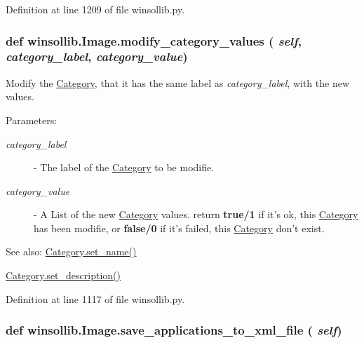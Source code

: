 Definition at line 1209 of file winsollib.py.\hypertarget{classwinsollib_1_1Image_8fc4339cad75e0b687bba38e2fbd2545}{
\subsubsection[modify\_\-category\_\-values]{\setlength{\rightskip}{0pt plus 5cm}def winsollib.Image.modify\_\-category\_\-values ( {\em self},  {\em category\_\-label},  {\em category\_\-value})}}
\label{classwinsollib_1_1Image_8fc4339cad75e0b687bba38e2fbd2545}


Modify the \hyperlink{classwinsollib_1_1Category}{Category}, that it has the same label as {\em category\_\-label\/}, with the new values. 

\begin{Desc}
\item[Parameters:]
\begin{description}
\item[{\em category\_\-label}]- The label of the \hyperlink{classwinsollib_1_1Category}{Category} to be modifie. \item[{\em category\_\-value}]- A List of the new \hyperlink{classwinsollib_1_1Category}{Category} values. return {\bf true/1} if it's ok, this \hyperlink{classwinsollib_1_1Category}{Category} has been modifie, or {\bf false/0} if it's failed, this \hyperlink{classwinsollib_1_1Category}{Category} don't exist.\end{description}
\end{Desc}
\begin{Desc}
\item[See also:]\hyperlink{classwinsollib_1_1Category_c5946ade32f0125e54082e062bc48d4c}{Category.set\_\-name()} 

\hyperlink{classwinsollib_1_1Category_c1ebe25d537e9c7c9482e397dbf4deed}{Category.set\_\-description()} \end{Desc}


Definition at line 1117 of file winsollib.py.\hypertarget{classwinsollib_1_1Image_34fc12f8ac22e909bff7263b0ca020c8}{
\subsubsection[save\_\-applications\_\-to\_\-xml\_\-file]{\setlength{\rightskip}{0pt plus 5cm}def winsollib.Image.save\_\-applications\_\-to\_\-xml\_\-file ( {\em self})}}
\label{classwinsollib_1_1Image_34fc12f8ac22e909bff7263b0ca020c8}


